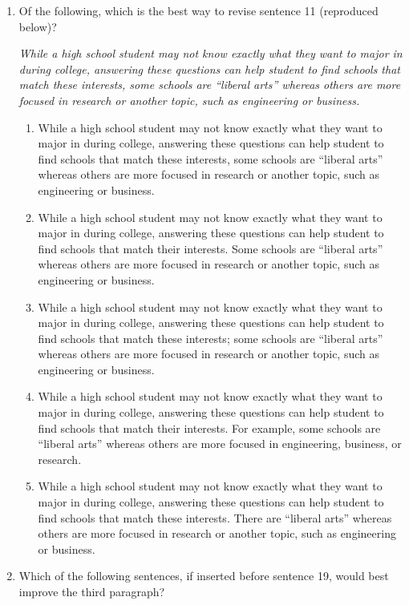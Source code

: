 \begin{enumerate}
\item Of the following, which is the best way to revise sentence 11 (reproduced below)?

\bigskip
\textit{While a high school student may not know exactly what they want to major in during college, answering these questions can help student to find schools that match these interests, some schools are ``liberal arts'' whereas others are more focused in research or another topic, such as engineering or business.}

\bigskip
\begin{enumerate}[label=(\Alph*)]
\item While a high school student may not know exactly what they want to major in during college, answering these questions can help student to find schools that match these interests, some schools are ``liberal arts'' whereas others are more focused in research or another topic, such as engineering or business.
\item While a high school student may not know exactly what they want to major in during college, answering these questions can help student to find schools that match their interests. Some schools are ``liberal arts'' whereas others are more focused in research or another topic, such as engineering or business.
\item  While a high school student may not know exactly what they want to major in during college, answering these questions can help student to find schools that match these interests; some schools are ``liberal arts'' whereas others are more focused in research or another topic, such as engineering or business.
\item While a high school student may not know exactly what they want to major in during college, answering these questions can help student to find schools that match their interests. For example, some schools are ``liberal arts'' whereas others are more focused in engineering, business, or research.
\item  While a high school student may not know exactly what they want to major in during college, answering these questions can help student to find schools that match these interests. There are ``liberal arts'' whereas others are more focused in research or another topic, such as engineering or business.
\end{enumerate}

\bigskip
\item Which of the following sentences, if inserted before sentence 19, would best improve the third paragraph?


\end{enumerate}
